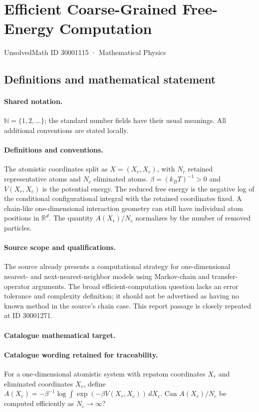 \documentclass[11pt]{article}
\begin{document}
\setcounter{section}{30001114}
\section{Efficient Coarse-Grained Free-Energy Computation}\label{30001115}
{\small UnsolvedMath ID 30001115 · Mathematical Physics}
\subsection{Definitions and mathematical statement}

\paragraph{Shared notation.}$\mathbb N=\{1,2,\ldots\}$; the standard number fields have their usual meanings. All additional conventions are stated locally.


\paragraph{Definitions and conventions.} The atomistic coordinates split as $X=(X_r,X_c)$, with $N_r$ retained representative atoms and $N_c$ eliminated atoms. $\beta=(k_BT)^{-1}>0$ and $V(X_r,X_c)$ is the potential energy. The reduced free energy is the negative log of the conditional configurational integral with the retained coordinates fixed. A chain-like one-dimensional interaction geometry can still have individual atom positions in $\mathbb R^d$. The quantity $A(X_r)/N_c$ normalizes by the number of removed particles.

\paragraph{Source scope and qualifications.} The source already presents a computational strategy for one-dimensional nearest- and next-nearest-neighbor models using Markov-chain and transfer-operator arguments. The broad efficient-computation question lacks an error tolerance and complexity definition; it should not be advertised as having no known method in the source's chain case. This report passage is closely repeated at ID 30001271.

\paragraph{Catalogue mathematical target.}
\paragraph{Catalogue wording retained for traceability.}
For a one-dimensional atomistic system with repatom coordinates $X_r$ and eliminated coordinates $X_c$, define $A(X_r)=-\beta^{-1}\log\int\exp(-\beta V(X_r,X_c))\,dX_c$. Can $A(X_r)/N_c$ be computed efficiently as $N_c\to\infty$?
\end{document}
